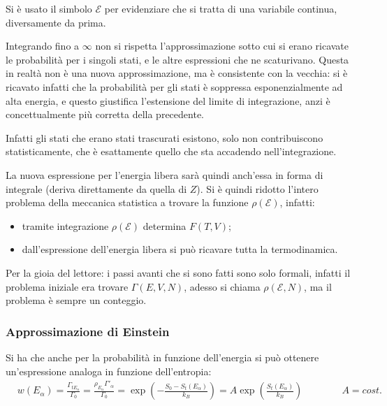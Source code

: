Si è usato il simbolo $\mathcal{E}$ per evidenziare che si tratta di una variabile continua, diversamente da prima.

\begin{note}
	Integrando fino a $\infty$ non si rispetta l'approssimazione sotto cui si erano ricavate le probabilità per i singoli stati, e le altre espressioni che ne scaturivano. Questa in realtà non è una nuova approssimazione, ma è consistente con la vecchia: si è ricavato infatti che la probabilità per gli stati è soppressa esponenzialmente ad alta energia, e questo giustifica l'estensione del limite di integrazione, anzi è concettualmente più corretta della precedente.
	
	Infatti gli stati che erano stati trascurati esistono, solo non contribuiscono statisticamente, che è esattamente quello che sta accadendo nell'integrazione.
\end{note}

La nuova espressione per l'energia libera sarà quindi anch'essa in forma di integrale (deriva direttamente da quella di $Z$). Si è quindi ridotto l'intero problema della meccanica statistica a trovare la funzione $\rho(\mathcal{E})$, infatti:

\begin{itemize}
	\item tramite integrazione $\rho(\mathcal{E})$ determina $F(T,V)$;
	\item dall'espressione dell'energia libera si può ricavare tutta la termodinamica.
\end{itemize}

Per la gioia del lettore: i passi avanti che si sono fatti sono solo formali, infatti il problema iniziale era trovare $\Gamma(E,V,N)$, adesso si chiama $\rho(\mathcal{E}, N)$, ma il problema è sempre un conteggio.

\subsubsection{Approssimazione di Einstein}

Si ha che anche per la probabilità in funzione dell'energia si può ottenere un'espressione analoga in funzione dell'entropia:
\begin{align*}
&w(E_\alpha) = \frac{\Gamma_{tE_\alpha}}{\Gamma_0} = \frac{\rho_{E_\alpha} \Gamma'_\alpha}{\Gamma_0} = \exp \left(- \frac{S_0 - S_t(E_\alpha)}{k_B}\right) = A \exp \left(\frac{S_t(E_\alpha)}{k_B}\right) \qquad \qquad A = cost.\\
\end{align*}

